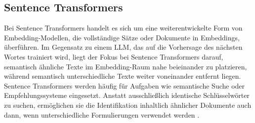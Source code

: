 \subsection{Sentence Transformers}
\label{sec:sentence_transformers}

Bei Sentence Transformers handelt es sich um eine weiterentwickelte Form von Embedding-Modellen, die vollständige Sätze oder Dokumente in Embeddings, überführen.
Im Gegensatz zu einem LLM, das auf die Vorhersage des nächsten Wortes trainiert wird, liegt der Fokus bei Sentence Transformers darauf, 
semantisch ähnliche Texte im Embedding-Raum nahe beieinander zu platzieren, während semantisch unterschiedliche Texte weiter voneinander entfernt liegen.
Sentence Transformers werden häufig für Aufgaben wie semantische Suche oder Empfehlungssysteme eingesetzt.
Anstatt ausschließlich identische Schlüsselwörter zu suchen, ermöglichen sie die Identifikation inhaltlich ähnlicher Dokumente auch dann, wenn unterschiedliche Formulierungen verwendet werden \parencite{Reimers2019SBERT}.

